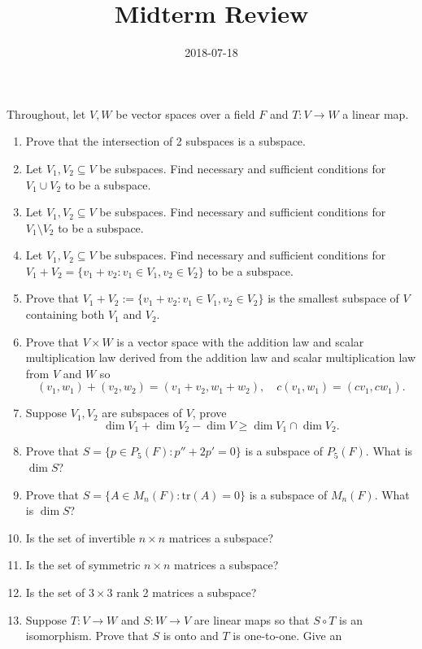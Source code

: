 \documentclass{article}
\title{Midterm Review}
\date{2018-07-18}
\begin{document}
\maketitle

Throughout, let $V,W$ be vector spaces over a field $F$ and $T:V\to W$ a linear
map.
\begin{enumerate}
    \item
        Prove that the intersection of 2 subspaces is a subspace.
    \item
        Let $V_1,V_2\subseteq V$ be subspaces. Find necessary and sufficient
        conditions for $V_1\cup V_2$ to be a subspace.
    \item
        Let $V_1,V_2\subseteq V$ be subspaces. Find necessary and sufficient
        conditions for $V_1\setminus V_2$ to be a subspace.
    \item
        Let $V_1,V_2\subseteq V$ be subspaces. Find necessary and sufficient
        conditions for $V_1+ V_2=\{v_1+v_2:v_1\in V_1, v_2\in V_2\}$ to be a
        subspace.
    \item
        Prove that $V_1+V_2:=\{v_1+v_2:v_1\in V_1, v_2\in V_2\}$ is the
        smallest subspace of $V$ containing both $V_1$ and $V_2$.
    \item
        Prove that $V\times W$ is a vector space with the addition law and
        scalar multiplication law derived from the addition law and scalar
        multiplication law from $V$ and $W$ so
        \[
            (v_1, w_1)+(v_2,w_2)=(v_1+v_2, w_1+w_2), \quad
            c(v_1,w_1)=(cv_1,cw_1).
        \]
    \item
        Suppose $V_1, V_2$ are subspaces of $V$, prove
        \[
            \dim V_1+\dim V_2 -\dim V \geq \dim V_1\cap \dim V_2.
        \]
    \item
        Prove that $S=\{p\in P_5(F):p''+2p'=0\}$ is a subspace of $P_5(F)$.
        What is $\dim S$?
    \item
        Prove that $S = \{A\in M_n(F):\mathrm{tr}(A)=0\}$ is a subspace
        of $M_n(F)$. What is $\dim S$?
    \item
        Is the set of invertible $n\times n$ matrices a subspace?
    \item
        Is the set of symmetric $n\times n$ matrices a subspace?
    \item
        Is the set of $3\times 3$ rank 2 matrices a subspace?
    \item
        Suppose $T:V\to W$ and $S:W\to V$ are linear maps so that $S\circ T$ is
        an isomorphism. Prove that $S$ is onto and $T$ is one-to-one. Give an

\end{enumerate}
\end{document}
